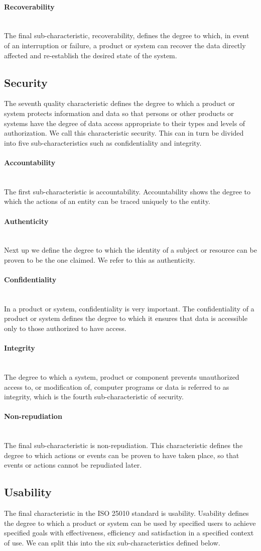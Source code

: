 \documentclass[twoside]{uva-inf-bachelor-thesis}
\newcommand{\myparagraph}[1]{\paragraph{#1}\mbox{}\\}
\begin{document}
\myparagraph{Recoverability}
The final sub-characteristic, recoverability, defines the degree to which, in event of an interruption or failure, a product or system can recover the data directly affected and re-establish the desired state of the system.

\subsection{Security}
The seventh quality characteristic defines the degree to which a product or system protects information and data so that persons or other products or systems have the degree of data access appropriate to their types and levels of authorization. We call this characteristic security. This can in turn be divided into five sub-characteristics such as confidentiality and integrity.

\myparagraph{Accountability}
The first sub-characteristic is accountability. Accountability shows the degree to which the actions of an entity can be traced uniquely to the entity.

\myparagraph{Authenticity}
Next up we define the degree to which the identity of a subject or resource can be proven to be the one claimed. We refer to this as authenticity.

\myparagraph{Confidentiality}
In a product or system, confidentiality is very important. The confidentiality of a product or system defines the degree to which it ensures that data is accessible only to those authorized to have access.

\myparagraph{Integrity}
The degree to which a system, product or component prevents unauthorized access to, or modification of, computer programs or data is referred to as integrity, which is the fourth sub-characteristic of security.

\myparagraph{Non-repudiation}
The final sub-characteristic is non-repudiation. This characteristic defines the degree to which actions or events can be proven to have taken place, so that events or actions cannot be repudiated later.

\subsection{Usability}
The final characteristic in the ISO 25010 standard is usability. Usability defines the degree to which a product or system can be used by specified users to achieve specified goals with effectiveness, efficiency and satisfaction in a specified context of use. We can split this into the six sub-characteristics defined below.
\end{document}
